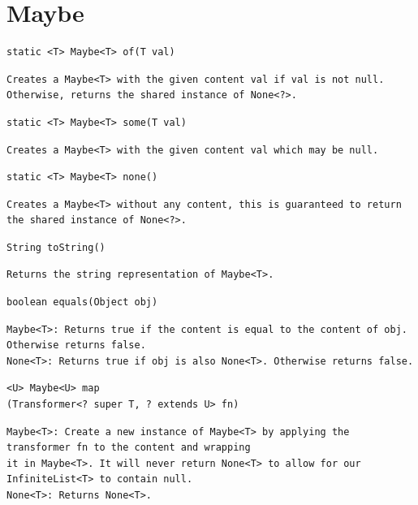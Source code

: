 \documentclass[5pt, portrait]{article}
\begin{document}
\section{Maybe}
\begin{verbatim}
static <T> Maybe<T> of(T val)
\end{verbatim}
\begin{verbatim}
Creates a Maybe<T> with the given content val if val is not null.
Otherwise, returns the shared instance of None<?>.
\end{verbatim}

\begin{verbatim}
static <T> Maybe<T> some(T val)
\end{verbatim}
\begin{verbatim}
Creates a Maybe<T> with the given content val which may be null.
\end{verbatim}

\begin{verbatim}
static <T> Maybe<T> none()
\end{verbatim}
\begin{verbatim}
Creates a Maybe<T> without any content, this is guaranteed to return the shared instance of None<?>.
\end{verbatim}

\begin{verbatim}
String toString()
\end{verbatim}
\begin{verbatim}
Returns the string representation of Maybe<T>.
\end{verbatim}

\begin{verbatim}
boolean equals(Object obj)
\end{verbatim}
\begin{verbatim}
Maybe<T>: Returns true if the content is equal to the content of obj. Otherwise returns false.
None<T>: Returns true if obj is also None<T>. Otherwise returns false.
\end{verbatim}

\begin{verbatim}
<U> Maybe<U> map
(Transformer<? super T, ? extends U> fn)
\end{verbatim}
\begin{verbatim}
Maybe<T>: Create a new instance of Maybe<T> by applying the transformer fn to the content and wrapping
it in Maybe<T>. It will never return None<T> to allow for our InfiniteList<T> to contain null.
None<T>: Returns None<T>.
\end{verbatim}
\end{document}
